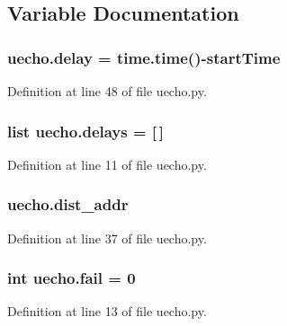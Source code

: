 \subsection{Variable Documentation}
\subsubsection[{\texorpdfstring{delay}{delay}}]{\setlength{\rightskip}{0pt plus 5cm}uecho.\+delay = time.\+time()-\/{\bf start\+Time}}\hypertarget{namespaceuecho_aa23fa5975707e43123dfed328f1b2b78}{}\label{namespaceuecho_aa23fa5975707e43123dfed328f1b2b78}


Definition at line 48 of file uecho.\+py.

\subsubsection[{\texorpdfstring{delays}{delays}}]{\setlength{\rightskip}{0pt plus 5cm}list uecho.\+delays = \mbox{[}$\,$\mbox{]}}\hypertarget{namespaceuecho_a6644677cc8dc060e9dbed21d5674ff97}{}\label{namespaceuecho_a6644677cc8dc060e9dbed21d5674ff97}


Definition at line 11 of file uecho.\+py.

\subsubsection[{\texorpdfstring{dist\+\_\+addr}{dist_addr}}]{\setlength{\rightskip}{0pt plus 5cm}uecho.\+dist\+\_\+addr}\hypertarget{namespaceuecho_a92f666ccf7137639b4da6f1f7406671a}{}\label{namespaceuecho_a92f666ccf7137639b4da6f1f7406671a}


Definition at line 37 of file uecho.\+py.

\subsubsection[{\texorpdfstring{fail}{fail}}]{\setlength{\rightskip}{0pt plus 5cm}int uecho.\+fail = 0}\hypertarget{namespaceuecho_ae80421c5c79035c7d49b3c74dd7ff335}{}\label{namespaceuecho_ae80421c5c79035c7d49b3c74dd7ff335}


Definition at line 13 of file uecho.\+py.

